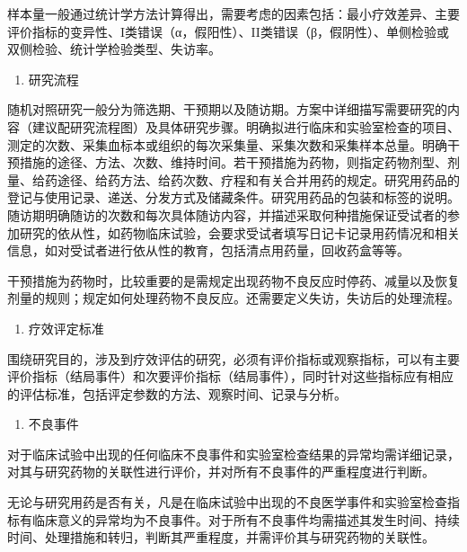 \documentclass[
  chinese-hans,
  letterpaper,
  DIV=11,
  numbers=noendperiod]{scrreprt}
\providecommand{\tightlist}{%
  \setlength{\itemsep}{0pt}\setlength{\parskip}{0pt}}
\begin{document}
样本量一般通过统计学方法计算得出，需要考虑的因素包括：最小疗效差异、主要评价指标的变异性、I类错误（α，假阳性）、II类错误（β，假阴性）、单侧检验或双侧检验、统计学检验类型、失访率。

\begin{enumerate}
\def\labelenumi{\arabic{enumi}.}
\setcounter{enumi}{5}
\tightlist
\item
  研究流程
\end{enumerate}

随机对照研究一般分为筛选期、干预期以及随访期。方案中详细描写需要研究的内容（建议配研究流程图）及具体研究步骤。明确拟进行临床和实验室检查的项目、测定的次数、采集血标本或组织的每次采集量、采集次数和采集样本总量。明确干预措施的途径、方法、次数、维持时间。若干预措施为药物，则指定药物剂型、剂量、给药途径、给药方法、给药次数、疗程和有关合并用药的规定。研究用药品的登记与使用记录、递送、分发方式及储藏条件。研究用药品的包装和标签的说明。随访期明确随访的次数和每次具体随访内容，并描述采取何种措施保证受试者的参加研究的依从性，如药物临床试验，会要求受试者填写日记卡记录用药情况和相关信息，如对受试者进行依从性的教育，包括清点用药量，回收药盒等等。

干预措施为药物时，比较重要的是需规定出现药物不良反应时停药、减量以及恢复剂量的规则；规定如何处理药物不良反应。还需要定义失访，失访后的处理流程。

\begin{enumerate}
\def\labelenumi{\arabic{enumi}.}
\setcounter{enumi}{6}
\tightlist
\item
  疗效评定标准
\end{enumerate}

围绕研究目的，涉及到疗效评估的研究，必须有评价指标或观察指标，可以有主要评价指标（结局事件）和次要评价指标（结局事件），同时针对这些指标应有相应的评估标准，包括评定参数的方法、观察时间、记录与分析。

\begin{enumerate}
\def\labelenumi{\arabic{enumi}.}
\setcounter{enumi}{7}
\tightlist
\item
  不良事件
\end{enumerate}

对于临床试验中出现的任何临床不良事件和实验室检查结果的异常均需详细记录，对其与研究药物的关联性进行评价，并对所有不良事件的严重程度进行判断。

无论与研究用药是否有关，凡是在临床试验中出现的不良医学事件和实验室检查指标有临床意义的异常均为不良事件。对于所有不良事件均需描述其发生时间、持续时间、处理措施和转归，判断其严重程度，并需评价其与研究药物的关联性。
\end{document}
